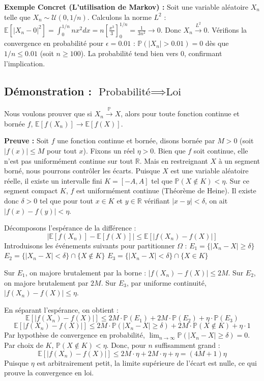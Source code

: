 \documentclass[11pt,a4paper]{article}
\begin{document}
\textbf{Exemple Concret (L'utilisation de Markov) :}
Soit une variable aléatoire $X_n$ telle que $X_n \sim \mathcal{U}(0, 1/n)$.
Calculons la norme $L^2$ : $\mathbb{E}[|X_n - 0|^2] = \int_0^{1/n} n x^2 dx = n [\frac{x^3}{3}]_0^{1/n} = \frac{1}{3n^2} \to 0$.
Donc $X_n \xrightarrow{L^2} 0$.
Vérifions la convergence en probabilité pour $\epsilon = 0.01$ :
$\mathbb{P}(|X_n| > 0.01) = 0$ dès que $1/n \le 0.01$ (soit $n \ge 100$).
La probabilité tend bien vers $0$, confirmant l'implication.


\subsection{Démonstration : $\text{Probabilité} \implies \text{Loi}$}

Nous voulons prouver que si $X_n \xrightarrow{\mathbb{P}} X$, alors pour toute fonction continue et bornée $f$, $\mathbb{E}[f(X_n)] \to \mathbb{E}[f(X)]$.

\textbf{Preuve :}
Soit $f$ une fonction continue et bornée, disons bornée par $M > 0$ (soit $|f(x)| \le M$ pour tout $x$).
Fixons un réel $\eta > 0$. Bien que $f$ soit continue, elle n'est pas uniformément continue sur tout $\mathbb{R}$. Mais en restreignant $X$ à un segment borné, nous pourrons contrôler les écarts.
Puisque $X$ est une variable aléatoire réelle, il existe un intervalle fini $K = [-A, A]$ tel que $\mathbb{P}(X \notin K) < \eta$.
Sur ce segment compact $K$, $f$ est uniformément continue (Théorème de Heine). Il existe donc $\delta > 0$ tel que pour tout $x \in K$ et $y \in \mathbb{R}$ vérifiant $|x - y| < \delta$, on ait $|f(x) - f(y)| < \eta$.

Décomposons l'espérance de la différence :
$$ |\mathbb{E}[f(X_n)] - \mathbb{E}[f(X)]| \le \mathbb{E}[|f(X_n) - f(X)|] $$
Introduisons les événements suivants pour partitionner $\Omega$ :
$E_1 = \{ |X_n - X| \ge \delta \}$
$E_2 = \{ |X_n - X| < \delta \} \cap \{ X \notin K \}$
$E_3 = \{ |X_n - X| < \delta \} \cap \{ X \in K \}$

Sur $E_1$, on majore brutalement par la borne : $|f(X_n) - f(X)| \le 2M$.
Sur $E_2$, on majore brutalement par $2M$.
Sur $E_3$, par uniforme continuité, $|f(X_n) - f(X)| \le \eta$.

En séparant l'espérance, on obtient :
$$ \mathbb{E}[|f(X_n) - f(X)|] \le 2M \cdot \mathbb{P}(E_1) + 2M \cdot \mathbb{P}(E_2) + \eta \cdot \mathbb{P}(E_3) $$
$$ \mathbb{E}[|f(X_n) - f(X)|] \le 2M \cdot \mathbb{P}(|X_n - X| \ge \delta) + 2M \cdot \mathbb{P}(X \notin K) + \eta \cdot 1 $$
Par hypothèse de convergence en probabilité, $\lim_{n \to \infty} \mathbb{P}(|X_n - X| \ge \delta) = 0$.
Par choix de $K$, $\mathbb{P}(X \notin K) < \eta$.
Donc, pour $n$ suffisamment grand :
$$ \mathbb{E}[|f(X_n) - f(X)|] \le 2M \cdot \eta + 2M \cdot \eta + \eta = (4M + 1)\eta $$
Puisque $\eta$ est arbitrairement petit, la limite supérieure de l'écart est nulle, ce qui prouve la convergence en loi.
\end{document}

